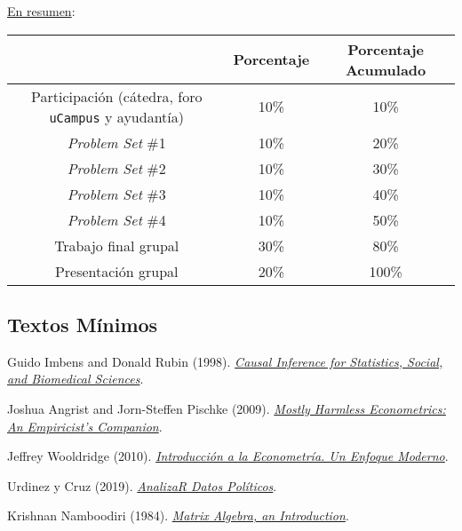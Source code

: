 \documentclass[letterpaper]{article}
\renewenvironment{itemize}{
  \begin{list}{}{
    \setlength{\leftmargin}{1.5em}
  }
}{
  \end{list}
}
\begin{document}
\underline{En resumen}:

\begin{table}[H]
\centering
\begin{tabular}{ccc}
							& \textbf{Porcentaje} & {\bf Porcentaje Acumulado} \\
							\hline
Participaci\'on (c\'atedra, foro \texttt{uCampus} y ayudant\'ia) 	 & 10\%       	 & 10\% \\
\hline
\emph{Problem Set} \#1 													 & 10\% 		 & 20\%  \\
\emph{Problem Set} \#2 													 & 10\% 		 & 30\%  \\
\emph{Problem Set} \#3 													 & 10\% 		 & 40\%  \\
\emph{Problem Set} \#4 													 & 10\% 		 & 50\%  \\
\hline
Trabajo final grupal 												 & 30\% 	 	 & 80\% \\
Presentaci\'on grupal												 & 20\% 	 	 & 100\% \\
\hline             
\end{tabular}
\end{table}


\subsection*{Textos M\'inimos}

\begin{itemize}
  \item[$\bullet$] Guido Imbens and Donald Rubin (1998). \href{https://github.com/hbahamonde/OLS/raw/master/Readings/Imbens_Rubin.pdf}{\emph{Causal Inference for Statistics, Social, and Biomedical Sciences}}.
  \item[$\bullet$] Joshua Angrist and Jorn-Steffen Pischke (2009). \href{https://github.com/hbahamonde/OLS/raw/master/Readings/MHE.pdf}{\emph{Mostly Harmless Econometrics: An Empiricist's Companion}}.
  \item[$\bullet$] Jeffrey Wooldridge (2010). \href{https://github.com/hbahamonde/OLS/raw/master/Readings/Wooldridge.pdf}{\emph{Introducci\'on a la Econometr\'ia. Un Enfoque Moderno}}.
  \item[$\bullet$] Urdinez y Cruz (2019). \href{https://arcruz0.github.io/libroadp/index.html}{\emph{AnalizaR Datos Pol\'iticos}}.
  \item[$\bullet$] Krishnan Namboodiri (1984). \href{https://github.com/hbahamonde/OLS/raw/master/Readings/Namboodiri.pdf}{\emph{Matrix Algebra, an Introduction}}.

\end{itemize}
\end{document}
